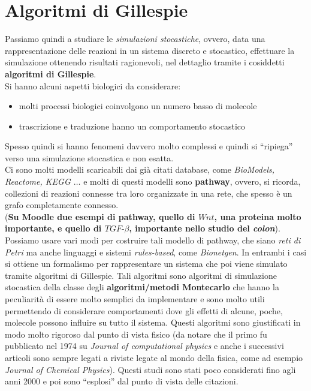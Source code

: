 \documentclass[a4paper,12pt, oneside]{book}
\begin{document}
\section{Algoritmi di Gillespie}
Passiamo quindi a studiare le \textit{simulazioni stocastiche}, ovvero, data una
rappresentazione delle reazioni in un sistema discreto e stocastico, effettuare
la simulazione ottenendo risultati ragionevoli, nel dettaglio tramite i
cosiddetti \textbf{algoritmi di Gillespie}.\\ 
Si hanno alcuni aspetti biologici da considerare:
\begin{itemize}
  \item molti processi biologici coinvolgono un numero basso di molecole
  \item trascrizione e traduzione hanno un comportamento stocastico
\end{itemize}
Spesso quindi si hanno fenomeni davvero molto complessi e quindi si ``ripiega''
verso una simulazione stocastica e non esatta.\\
Ci sono molti modelli scaricabili dai già citati database, come
\textit{BioModels, Reactome, KEGG $\ldots$} e molti di questi modelli sono
\textbf{pathway}, ovvero, si ricorda, collezioni di reazioni connesse tra loro
organizzate in una rete, che spesso è un grafo completamente connesso. \\
(\textbf{Su Moodle due esempi di pathway, quello di $Wnt$, una proteina molto
  importante, e quello di $TGF\mbox{-}\beta$, importante nello studio del
  \textit{colon}}).\\ 
Possiamo usare vari modi per costruire tali modello di pathway, che siano
\textit{reti di Petri} ma anche linguaggi e sistemi \textit{rules-based}, come
\textit{Bionetgen}. In entrambi i casi si ottiene un formalismo per
rappresentare un sistema che poi viene simulato tramite algoritmi di
Gillespie. Tali algoritmi sono algoritmi di simulazione stocastica della classe
degli \textbf{algoritmi/metodi Montecarlo} che hanno la peculiarità di essere
molto semplici da implementare e sono molto utili permettendo di considerare
comportamenti dove gli effetti di alcune, poche, molecole possono influire su
tutto il sistema. Questi algoritmi sono giustificati in modo molto rigoroso dal
punto di vista fisico (da notare che il primo fu pubblicato nel 1974 su
\textit{Journal of computational physics} e anche i successivi articoli sono
sempre legati a riviste legate al mondo della fisica, come ad esempio
\textit{Journal of Chemical Physics}). Questi studi sono stati poco considerati
fino agli anni 2000 e poi sono ``esplosi'' dal punto di vista delle citazioni.\\
\end{document}
